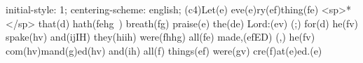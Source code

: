 initial-style: 1;
centering-scheme: english;
(c4)Let(e) eve(e)ry(ef)thing(fe) <sp>*</sp> that(d) hath(fehg~) breath(fg) praise(e) the(de) Lord:(ev) (;) for(d) he(fv) spake(hv) and(ijIH) they(hiih) were(fhhg) all(fe) made,(efED) (,) he(fv) com(hv)mand(g)ed(hv) and(ih) all(f) things(ef) were(gv) cre(f)at(e)ed.(e)
